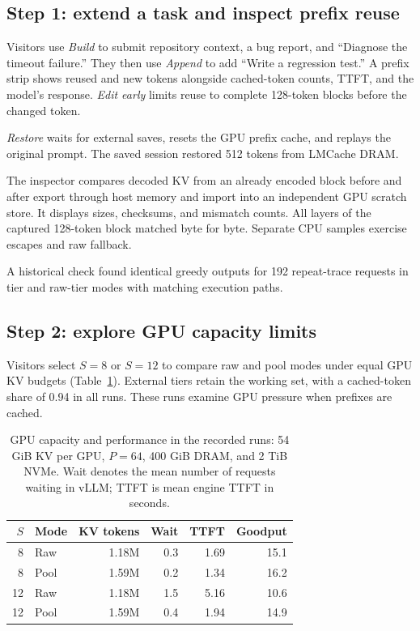 \documentclass[conference]{IEEEtran}
\begin{document}
\subsection{Step 1: extend a task and inspect prefix reuse}
Visitors use \emph{Build} to submit repository context, a bug report,
and ``Diagnose the timeout failure.'' They then use \emph{Append} to add
``Write a regression test.'' A prefix strip shows reused and new tokens
alongside cached-token counts, TTFT, and the model's response.
\emph{Edit early} limits reuse to complete
128-token blocks before the changed token.

\emph{Restore} waits for external saves, resets the GPU prefix cache, and
replays the original prompt. The saved session restored 512 tokens from
LMCache DRAM.

The inspector compares decoded KV from an already encoded block before
and after export through host memory and import into an independent GPU
scratch store. It displays sizes, checksums, and mismatch counts. All layers
of the captured 128-token block matched byte for byte. Separate CPU samples
exercise escapes and raw fallback.

A historical check found identical greedy outputs for 192 repeat-trace
requests in tier and raw-tier modes with matching execution paths.

\subsection{Step 2: explore GPU capacity limits}
Visitors select $S=8$ or $S=12$ to compare raw and pool modes under equal
GPU KV budgets (Table~\ref{tab:gpu}). External tiers retain the working set,
with a cached-token share of 0.94 in all runs. These runs examine GPU
pressure when prefixes are cached.

\begin{table}[t]
\centering
\caption{GPU capacity and performance in the recorded runs: 54 GiB KV per
GPU, $P=64$, 400 GiB DRAM, and 2 TiB NVMe. Wait denotes the mean number of
requests waiting in vLLM; TTFT is mean engine TTFT in seconds.}
\label{tab:gpu}
\small
\setlength{\tabcolsep}{3pt}
\begin{tabular*}{\columnwidth}{@{\extracolsep{\fill}}rlrrrr@{}}
\toprule
$S$ & Mode & KV tokens & Wait & TTFT & Goodput \\
\midrule
8  & Raw  & 1.18M & 0.3 & 1.69 & 15.1 \\
8  & Pool & 1.59M & 0.2 & 1.34 & 16.2 \\
12 & Raw  & 1.18M & 1.5 & 5.16 & 10.6 \\
12 & Pool & 1.59M & 0.4 & 1.94 & 14.9 \\
\bottomrule
\end{tabular*}
\end{table}
\end{document}

